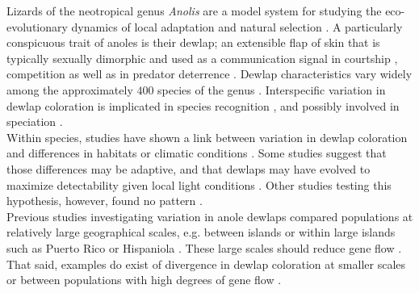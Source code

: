 
Lizards of the neotropical genus \textit{Anolis} are a model system for studying the eco-evolutionary dynamics of local adaptation and natural selection \citep{Losos2009}. A particularly conspicuous trait of anoles is their dewlap; an extensible flap of skin that is typically sexually dimorphic and used as a communication signal in courtship \citep{Sigmund1983, Driessens2014, Driessens2015}, competition \citep{Losos1985, Macedonia1994, Macedonia2013} as well as in predator deterrence \citep{Leal1995, Leal1997, Leal1997b}. Dewlap characteristics vary widely among the approximately $400$ species of the genus \citep{Nicholson2007}. Interspecific variation in dewlap coloration is implicated in species recognition \citep{Rand1970b, Williams1969, Williams1977, Losos1985, Macedonia1994, Fleishman2000, Macedonia2013}, and possibly involved in speciation \citep{Lambert2013, Geneva2015, Ng2017}.\\

Within species, studies have shown a link between variation in dewlap coloration and differences in habitats or climatic conditions \citep{Macedonia2001, Leal2002, Thorpe2002a, Thorpe2002b, Leal2004, Vanhooydonck2009, Ng2012, Ng2013, Ng2016, Vanhooydonck2009, Driessens2017}. Some studies suggest that those differences may be adaptive, and that dewlaps may have evolved to maximize detectability given local light conditions \citep{Fleishman2001, Leal2002, Leal2004}. Other studies testing this hypothesis, however, found no pattern \citep{Fleishman2009, Ng2012, Macedonia2014a}.\\ 



Previous studies investigating variation in anole dewlaps compared populations at relatively large geographical scales, e.g. between islands \citep{Vanhooydonck2009, Driessens2017} or within large islands such as Puerto Rico \citep{Leal2002, Leal2004} or Hispaniola \citep{Ng2012, Ng2016}. These large scales should reduce gene flow \citep{Ng2011, Lambert2013, Richardson2014, Ng2017}. That said, examples do exist of divergence in dewlap coloration at smaller scales or between populations with high degrees of gene flow \citep{Thorpe2002a, Thorpe2002b, Stapley2011, Ng2016}.\\

